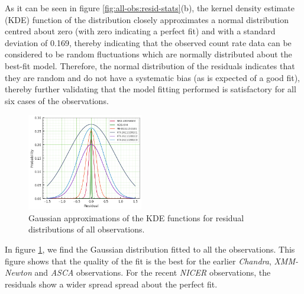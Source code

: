     As it can be seen in figure \ref{fig:all-obs:resid-stats}(b), the kernel density estimate (KDE) function of the distribution closely approximates a normal distribution centred about zero (with zero indicating a perfect fit) and with a standard deviation of 0.169, thereby indicating that the observed count rate data can be considered to be random fluctuations which are normally distributed about the best-fit model. Therefore, the normal distribution of the residuals indicates that they are random and do not have a systematic bias (as is expected of a good fit), thereby further validating that the model fitting performed is satisfactory for all six cases of the observations.
    
    \begin{figure}[!htb]
    	\centering
    	\includegraphics[width=0.45\textwidth]{figures/resid/mr-vel-resid-gaussfit_all-obs.png}
    	\caption{Gaussian approximations of the KDE functions for residual distributions of all observations.}
    	\label{fig:all-obs:resid-gaussfit}
    \end{figure}
    
    In figure \ref{fig:all-obs:resid-gaussfit}, we find the Gaussian distribution fitted to all the observations. This figure shows that the quality of the fit is the best for the earlier \textit{Chandra}, \textit{XMM-Newton} and \textit{ASCA} observations. For the recent \textit{NICER} observations, the residuals show a wider spread spread about the perfect fit.
    
    
    

